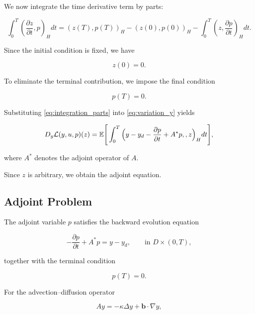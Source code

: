 We now integrate the time derivative term by parts:

\begin{equation}
\int_0^T
\left(
\frac{\partial z}{\partial t},
p
\right)_H
dt
=
(z(T),p(T))_H
-
(z(0),p(0))_H
-
\int_0^T
\left(
z,
\frac{\partial p}{\partial t}
\right)_H
dt.
\label{eq:integration_parts}
\end{equation}

Since the initial condition is fixed, we have

\[
z(0)=0.
\]

To eliminate the terminal contribution, we impose the final condition

\begin{equation}
p(T)=0.
\label{eq:adjoint_final}
\end{equation}

Substituting \eqref{eq:integration_parts} into \eqref{eq:variation_y} yields

\begin{equation}
\begin{aligned}
D_y\mathcal L(y,u,p)(z)
=
\mathbb{E}
\Bigg[
\int_0^T
\Big(
y-y_d
-
\frac{\partial p}{\partial t}
+
A^\ast p,
,z
\Big)_H
dt
\Bigg],
\end{aligned}
\label{eq:variation_final}
\end{equation}

where \(A^\ast\) denotes the adjoint operator of \(A\).

Since \(z\) is arbitrary, we obtain the adjoint equation.

\subsection{Adjoint Problem}

The adjoint variable \(p\) satisfies the backward evolution equation

\begin{equation}
-\frac{\partial p}{\partial t}
+
A^\ast p
=
y-y_d,
\qquad
\text{in }
D\times(0,T),
\label{eq:adjoint_abstract}
\end{equation}

together with the terminal condition

\begin{equation}
p(T)=0.
\label{eq:adjoint_terminal}
\end{equation}

For the advection--diffusion operator

\[
Ay
=
-\kappa \Delta y
+
\mathbf b\cdot\nabla y,
\]

